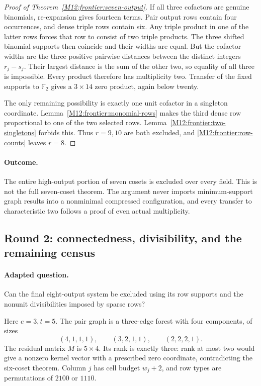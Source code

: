 \documentclass[11pt,a4paper,oneside]{report}
\theoremstyle{definition}
\theoremstyle{remark}
\begin{document}
\begin{proof}[Proof of Theorem~\ref{M12:frontier:seven-output}]
If all three cofactors are genuine binomials, re-expansion gives
fourteen terms. Pair output rows contain four occurrences, and dense
triple rows contain six. Any triple product in one of the latter
rows forces that row to consist of two triple products. The three
shifted binomial supports then coincide and their widths are equal.
But the cofactor widths are the three positive pairwise distances
between the distinct integers $r_j-s_j$. Their largest distance is
the sum of the other two, so equality of all three is impossible.
Every product therefore has multiplicity two. Transfer of the fixed
supports to $\mathbb F_2$ gives a $3\times14$ zero product, again
below twenty.

The only remaining possibility is exactly one unit cofactor in a
singleton coordinate. Lemma~\ref{M12:frontier:monomial-rows} makes the
third dense row proportional to one of the two selected rows.
Lemma~\ref{M12:frontier:two-singletons} forbids this. Thus $r=9,10$
are both excluded, and \eqref{M12:frontier:row-counts} leaves $r=8$.
\end{proof}

\paragraph{Outcome.}
The entire high-output portion of seven cosets is excluded over every
field. This is not the full seven-coset theorem. The argument never
imports minimum-support graph results into a nonminimal compressed
configuration, and every transfer to characteristic two follows a
proof of even actual multiplicity.

\subsection{Round 2: connectedness, divisibility, and the remaining census}

\paragraph{Adapted question.}
Can the final eight-output system be excluded using its row supports
and the nonunit divisibilities imposed by sparse rows?

Here $e=3,t=5$. The pair graph is a three-edge forest with four
components, of sizes
\begin{equation}\label{M12:frontier:four-weights}
 (4,1,1,1),\qquad(3,2,1,1),\qquad(2,2,2,1).
\end{equation}
The residual matrix $M$ is $5\times4$. Its rank is exactly three:
rank at most two would give a nonzero kernel vector with a prescribed
zero coordinate, contradicting the six-coset theorem. Column $j$
has cell budget $w_j+2$, and row types are permutations of $2100$
or $1110$.
\end{document}
